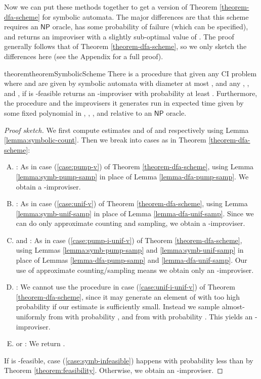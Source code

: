 \documentclass[a4paper,USenglish,numberwithinsect]{lipics}
\theoremstyle{plain}
\theoremstyle{definition}
\newcommand{\NP}{\ensuremath{\mathsf{NP}}}
\begin{document}
Now we can put these methods together to get a version of Theorem \ref{theorem-dfa-scheme} for symbolic automata. The major differences are that this scheme requires an {\NP} oracle, has some probability of failure (which can be specified), and returns an improviser with a slightly sub-optimal value of . The proof generally follows that of Theorem \ref{theorem-dfa-scheme}, so we only sketch the differences here (see the Appendix for a full proof).
\begin{restatable}{theorem}{theoremSymbolicScheme}
There is a procedure that given any CI problem  where  and  are given by symbolic automata with diameter at most , and any , , and , if  is -feasible returns an -improviser with probability at least . Furthermore, the procedure and the improvisers it generates run in expected time given by some fixed polynomial in , , , and  relative to an {\NP} oracle.
\end{restatable}
\begin{proof}[Proof sketch]
We first compute estimates  and  of  and  respectively using Lemma \ref{lemma:symbolic-count}. Then we break into cases as in Theorem \ref{theorem-dfa-scheme}:
\begin{enumerate}[(A)]
\item : As in case (\ref{case:pump-v}) of Theorem \ref{theorem-dfa-scheme}, using Lemma \ref{lemma:symb-pump-samp} in place of Lemma \ref{lemma-dfa-pump-samp}. We obtain a -improviser.

\item : As in case (\ref{case:unif-v}) of Theorem \ref{theorem-dfa-scheme}, using Lemma \ref{lemma:symb-unif-samp} in place of Lemma \ref{lemma-dfa-unif-samp}. Since we can do only approximate counting and sampling, we obtain a -improviser.

\item  and : As in case (\ref{case:pump-i-unif-v}) of Theorem \ref{theorem-dfa-scheme}, using Lemmas \ref{lemma:symb-pump-samp} and \ref{lemma:symb-unif-samp} in place of Lemmas \ref{lemma-dfa-pump-samp} and \ref{lemma-dfa-unif-samp}. Our use of approximate counting/sampling means we obtain only an -improviser.

\item : We cannot use the procedure in case (\ref{case:unif-i-unif-v}) of Theorem \ref{theorem-dfa-scheme}, since it may generate an element of  with too high probability if our estimate  is sufficiently small. Instead we sample almost-uniformly from  with probability , and from  with probability . This yields an -improviser.

\item \label{case:symb-infeasible}  or : We return .
\end{enumerate}

If  is -feasible, case (\ref{case:symb-infeasible}) happens with probability less than  by Theorem \ref{theorem:feasibility}. Otherwise, we obtain an -improviser.
\end{proof}
\end{document}
